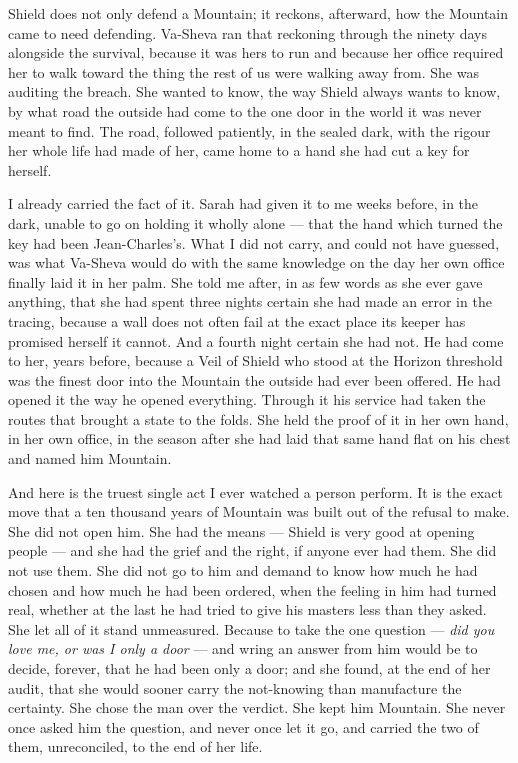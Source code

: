\ornament

Shield does not only defend a Mountain; it reckons, afterward, how the Mountain came to need defending. Va-Sheva ran that reckoning through the ninety days alongside the survival, because it was hers to run and because her office required her to walk toward the thing the rest of us were walking away from. She was auditing the breach. She wanted to know, the way Shield always wants to know, by what road the outside had come to the one door in the world it was never meant to find. The road, followed patiently, in the sealed dark, with the rigour her whole life had made of her, came home to a hand she had cut a key for herself.\par

I already carried the fact of it. Sarah had given it to me weeks before, in the dark, unable to go on holding it wholly alone --- that the hand which turned the key had been Jean-Charles's. What I did not carry, and could not have guessed, was what Va-Sheva would do with the same knowledge on the day her own office finally laid it in her palm. She told me after, in as few words as she ever gave anything, that she had spent three nights certain she had made an error in the tracing, because a wall does not often fail at the exact place its keeper has promised herself it cannot. And a fourth night certain she had not. He had come to her, years before, because a Veil of Shield who stood at the Horizon threshold was the finest door into the Mountain the outside had ever been offered. He had opened it the way he opened everything. Through it his service had taken the routes that brought a state to the folds. She held the proof of it in her own hand, in her own office, in the season after she had laid that same hand flat on his chest and named him Mountain.\par

And here is the truest single act I ever watched a person perform. It is the exact move that a ten thousand years of Mountain was built out of the refusal to make. She did not open him. She had the means --- Shield is very good at opening people --- and she had the grief and the right, if anyone ever had them. She did not use them. She did not go to him and demand to know how much he had chosen and how much he had been ordered, when the feeling in him had turned real, whether at the last he had tried to give his masters less than they asked. She let all of it stand unmeasured. Because to take the one question --- \emph{did you love me, or was I only a door} --- and wring an answer from him would be to decide, forever, that he had been only a door; and she found, at the end of her audit, that she would sooner carry the not-knowing than manufacture the certainty. She chose the man over the verdict. She kept him Mountain. She never once asked him the question, and never once let it go, and carried the two of them, unreconciled, to the end of her life.\par

